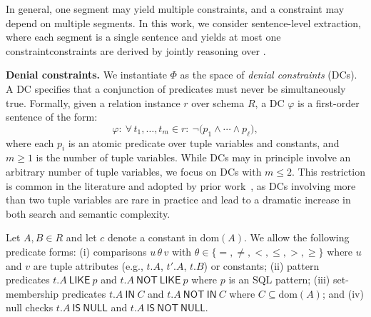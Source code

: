 
In general, one segment may yield multiple constraints, and a constraint may depend on multiple segments. In this work, we consider \DIFdelbegin {}\DIFdelend sentence-level extraction, where each segment is a single sentence and yields at most one constraint\DIFdelbegin {}\DIFdelend \DIFaddbegin {}\DIFaddend constraints are derived by jointly reasoning over \DIFdelbegin {}\DIFdelend \DIFaddbegin {}\DIFaddend .


\smallskip\noindent\textbf{Denial constraints.}
We instantiate $\Phi$ as the space of \emph{denial constraints} (DCs). A DC specifies that a conjunction of predicates must never be simultaneously true. Formally, given a relation instance $r$ over schema $R$, a DC $\varphi$ is a first-order sentence of the form:
\[
\varphi:\ \forall\, t_1,\ldots,t_m \in r:\ \neg\big(p_1 \land \cdots \land p_\ell\big),
\]
where each $p_i$ is an atomic predicate over tuple variables and constants, and $m \ge 1$ is the number of tuple variables. While DCs may in principle involve an arbitrary number of tuple variables, we focus on DCs with $m \le 2$. This restriction is common in the literature and adopted by prior work~\cite{chu2013discovering,martin2025false, Pena2019DiscoveryDC}, as DCs involving more than two tuple variables are rare in practice and lead to a 
dramatic increase in both search and semantic complexity.


Let $A, B \in R$ and let $c$ denote a constant in $\mathrm{dom}(A)$. We allow the following predicate forms: (i) comparisons $u\,\theta\,v$ with $\theta \in \{=,\neq,<,\leq,>,\geq\}$ where $u$ and $v$ are tuple attributes (e.g., $t.A$, $t'.A$, $t.B$) or constants; (ii) pattern predicates $t.A\ \mathsf{LIKE}\ p$ and $t.A\ \mathsf{NOT\ LIKE}\ p$ where $p$ is an SQL pattern; (iii) set-membership predicates $t.A\ \mathsf{IN}\ C$ and $t.A\ \mathsf{NOT\ IN}\ C$ where $C \subseteq \mathrm{dom}(A)$; and
(iv) null checks $t.A\ \mathsf{IS\ NULL}$ and $t.A\ \mathsf{IS\ NOT\ NULL}$.

